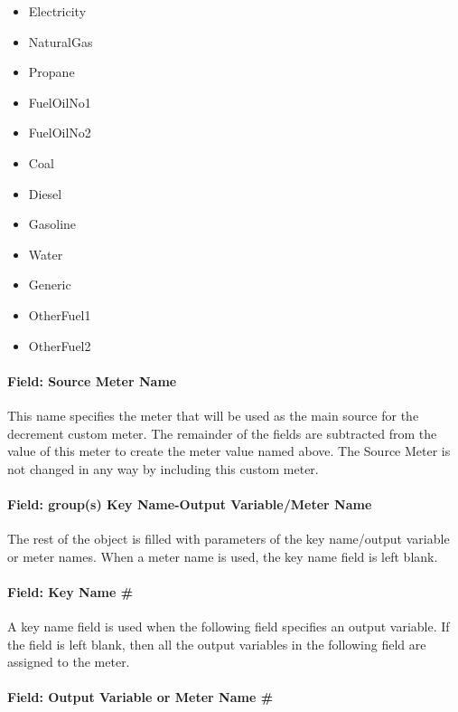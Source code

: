 \begin{itemize}
\item
  Electricity
\item
  NaturalGas
\item
  Propane
\item
  FuelOilNo1
\item
  FuelOilNo2
\item
  Coal
\item
  Diesel
\item
  Gasoline
\item
  Water
\item
  Generic
\item
  OtherFuel1
\item
  OtherFuel2
\end{itemize}

\paragraph{Field: Source Meter Name}\label{field-source-meter-name}

This name specifies the meter that will be used as the main source for the decrement custom meter. The remainder of the fields are subtracted from the value of this meter to create the meter value named above. The Source Meter is not changed in any way by including this custom meter.

\paragraph{Field: group(s) Key Name-Output Variable/Meter Name}\label{field-groups-key-name-output-variablemeter-name-1}

The rest of the object is filled with parameters of the key name/output variable or meter names. When a meter name is used, the key name field is left blank.

\paragraph{Field: Key Name \#}\label{field-key-name-1}

A key name field is used when the following field specifies an output variable. If the field is left blank, then all the output variables in the following field are assigned to the meter.

\paragraph{Field: Output Variable or Meter Name \#}\label{field-output-variable-or-meter-name-1}

